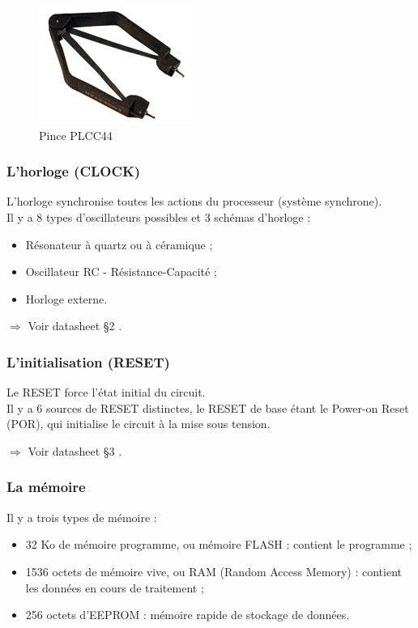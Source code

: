 \documentclass[a4paper]{article}
\begin{document}
\begin{figure}[H]
	\centering
	\includegraphics[scale=0.75]{Images/Pince_PLCC44.png}
	\caption{Pince PLCC44
		\label{Pince_PLCC44}}
\end{figure}

\subsubsection{L'horloge (CLOCK)}

L'horloge synchronise toutes les actions du processeur (système synchrone).\\
Il y a 8 types d'oscillateurs possibles et 3 schémas d'horloge :

\begin{itemize}
	\item Résonateur à quartz ou à céramique ;
	\item Oscillateur RC - Résistance-Capacité ;
	\item Horloge externe.
\end{itemize}

$\Rightarrow$ Voir datasheet §2 \cite{PIC18FXX2}.

\subsubsection{L'initialisation (RESET)}

Le RESET force l'état initial du circuit.\\
Il y a 6 sources de RESET distinctes, le RESET de base étant le \og{}Power-on Reset\fg{} (POR), qui initialise le circuit à la mise sous tension.

$\Rightarrow$ Voir datasheet §3 \cite{PIC18FXX2}.

\subsubsection{La mémoire}

Il y a trois types de mémoire :

\begin{itemize}
	\item 32 Ko de mémoire programme, ou mémoire FLASH : contient le programme ;
	\item 1536 octets de mémoire vive, ou RAM (Random Access Memory) : contient les données en cours de traitement ;
	\item 256 octets d'EEPROM : mémoire rapide de stockage de données.
\end{itemize}
\end{document}
